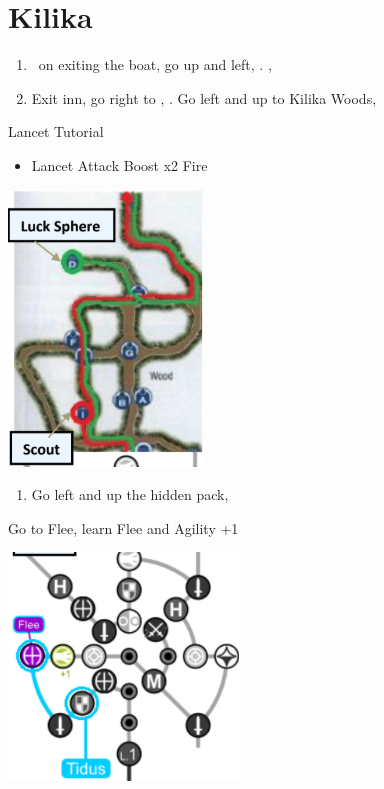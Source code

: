 \chapter{Kilika}

\begin{enumerate}
	\item \sd\ on exiting the boat, go up and left, \sd. \skippablefmv[2:00], \sd
	\item Exit inn, go right to \wakka, \sd. Go left and up to Kilika Woods, \sd
\end{enumerate}
\begin{battle}{Lancet Tutorial}
	\begin{itemize}
		\item \sd
		\kimahrif Lancet
		\tidusf Attack
		\summon{\valefor}
		\valeforf Boost x2
		\valeforf Fire
	\end{itemize}
\end{battle}
\includegraphics{graphics/kilikamap}
\begin{enumerate}[resume]
	\item Go left and up the hidden pack, 
\end{enumerate}
\begin{spheregrid}
	\begin{itemize}
		\tidusf Go to Flee, learn Flee and Agility +1
	\end{itemize}
	\includegraphics{graphics/tidusflee}
\end{spheregrid}

